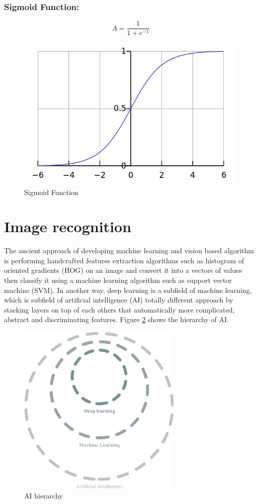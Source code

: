 \documentclass[12pt]{report}
\begin{document}
    \subsubsection{Sigmoid Function:}
    $$ A = \frac{1}{1+e^{-1}} $$

    \begin{figure} [h]
        \centering
        \includegraphics[width=.7\textwidth]{./images/sigmoid.png}
        \caption{Sigmoid Function}
        \label{fig:deep_learining}
    \end{figure}


\section{Image recognition}

    The ancient approach of developing machine learning and vision based algorithm
    is performing handcrafted features extraction algorithms such as histogram of oriented gradients (HOG) on an image
    and convert it into a vectors of values then classify it using a machine learning algorithm such as support vector machine (SVM).
    In another way, deep learning is a subfield of machine learning, which is subfield of artificial intelligence (AI)
    totally different approach by stacking layers on top of each others that automatically more complicated, abstract 
    and discriminating features. Figure \ref{fig:ai_hierarchy} shows the hierarchy of AI.
\bigbreak
\bigbreak
\begin{figure}[h]
    \centering
    \includegraphics[width=0.7\textwidth]{./images/ai_ml_dl.png}
    \caption{AI hierarchy}
    \label{fig:ai_hierarchy}
\end{figure} 
\end{document}
